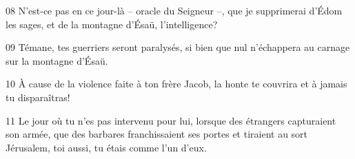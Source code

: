 
08 N’est-ce pas en ce jour-là – oracle du Seigneur –, que je supprimerai d’Édom les sages, et de la montagne d’Ésaü, l’intelligence?

09 Témane, tes guerriers seront paralysés, si bien que nul n’échappera au carnage sur la montagne d’Ésaü.

10 À cause de la violence faite à ton frère Jacob, la honte te couvrira et à jamais tu disparaîtras!

11 Le jour où tu n’es pas intervenu pour lui, lorsque des étrangers capturaient son armée, que des barbares franchissaient ses portes et tiraient au sort Jérusalem, toi aussi, tu étais comme l’un d’eux.
